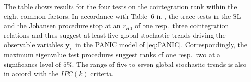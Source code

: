 \begin{table}[ht]	%
	\centering
	\caption[Cointegration rank tests]{Cointegration rank tests for the common factors.} 
	\resizebox{0.85\textwidth}{!}{
		}	
	\label{tab:MERMft}
\end{table}

The table shows results for the four tests on the cointegration rank within the eight common factors. In accordance with Table~6 in \citet[p.~68]{OersalArsova2017}, the trace tests in the SL- and the Johansen procedure stop at an $ r_{H0} $ of one resp.~three cointegration relations and thus suggest at least five global stochastic trends driving the observable variables $ \boldsymbol{y}_{it} $ in the PANIC model of \eqref{eq:PANIC}. Correspondingly, the maximum eigenvalue test procedures suggest ranks of one resp.~two at a significance level of $ 5 \% $. The range of five to seven global stochastic trends is also in accord with the $ IPC(k) $ criteria.



